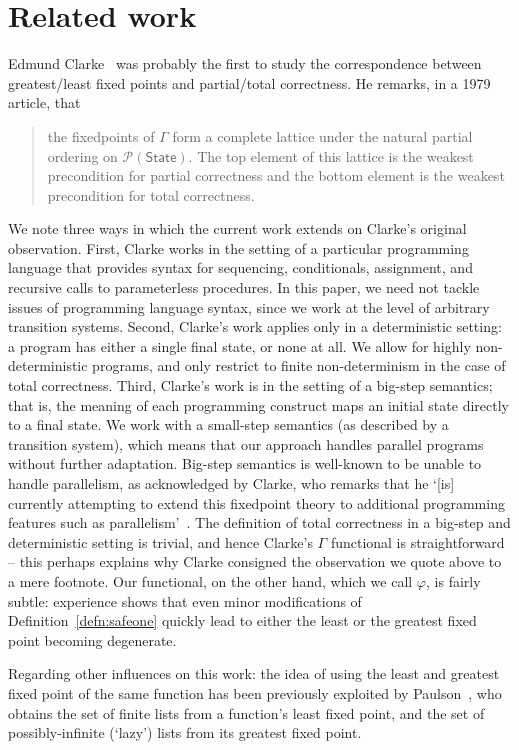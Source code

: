 \documentclass{llncs}
\newcommand\State{\mathsf{State}}
\newcommand\SafeOne{\varphi}
\newcommand\pow{\mathcal{P}}
\begin{document}
\section{Related work}
\label{sec:related}

Edmund Clarke~\cite{clarke79} was probably the first to study the
correspondence between greatest/least fixed points and partial/total
correctness. He remarks, in a 1979 article, that
%
\begin{quote}the fixedpoints of $\Gamma$ form a complete
lattice under the natural partial ordering on $\pow(\State)$. The top
element of this lattice is the weakest precondition for partial
correctness and the bottom element is the weakest precondition for
total correctness.~\cite[p.~279, footnote]{clarke79} \end{quote}
%
We note three ways in which the current work extends on Clarke's
original observation. First, Clarke works in the setting of a
particular programming language that provides syntax for sequencing,
conditionals, assignment, and recursive calls to parameterless
procedures. In this paper, we need not tackle issues of programming
language syntax, since we work at the level of arbitrary transition
systems. Second, Clarke's work applies only in a deterministic
setting: a program has either a single final state, or none at all. We
allow for highly non-deterministic programs, and only restrict to
finite non-determinism in the case of total correctness. Third,
Clarke's work is in the setting of a big-step semantics; that is, the
meaning of each programming construct maps an initial state directly
to a final state. We work with a small-step semantics (as described by
a transition system), which means that our approach handles parallel
programs without further adaptation. Big-step semantics is well-known
to be unable to handle parallelism, as acknowledged by Clarke, who
remarks that he `[is] currently attempting to extend this fixedpoint
theory to additional programming features such as
parallelism'~\cite[p.~292]{clarke79}. The definition of total
correctness in a big-step and deterministic setting is trivial, and
hence Clarke's $\Gamma$ functional is straightforward -- this perhaps
explains why Clarke consigned the observation we quote above to a mere
footnote. Our functional, on the other hand, which we call $\SafeOne$,
is fairly subtle: experience shows that even minor modifications of
Definition~\ref{defn:safeone} quickly lead to either the least or the
greatest fixed point becoming degenerate.

Regarding other influences on this work: the idea of using the least
and greatest fixed point of the same function has been previously
exploited by Paulson~\cite[\S3]{paulson97a}, who obtains the set of
finite lists from a function's least fixed point, and the set of
possibly-infinite (`lazy') lists from its greatest fixed point.
\end{document}
